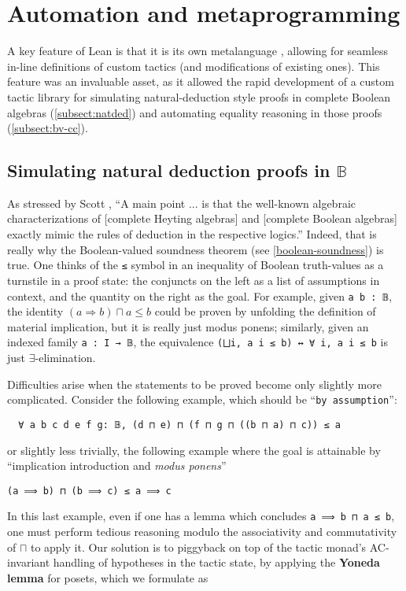 \documentclass[sigplan,10pt,review, autoref,anonymous]{acmart}
\newcommand{\lil}{\lstinline}
\theoremstyle{definition}
\begin{document}
\section{Automation and metaprogramming}
\label{section:metaprogramming}

A key feature of Lean is that it is its own metalanguage \cite{Ebner:2017:MFF:3136534.3110278}, allowing for seamless in-line definitions of custom tactics (and modifications of existing ones). This feature was an invaluable asset, as it allowed the rapid development of a custom tactic library for simulating natural-deduction style proofs in complete Boolean algebras (\autoref{subsect:natded}) and automating equality reasoning in those proofs (\autoref{subsect:bv-cc}).

\subsection{Simulating natural deduction proofs in \(\mathbb{B}\)} \label{subsect:natded}
As stressed by Scott \cite{scott2008algebraic}, ``A main point ... is that the well-known algebraic characterizations of [complete Heyting algebras] and [complete Boolean algebras] exactly mimic the rules of deduction in the respective logics.'' Indeed, that is really why the Boolean-valued soundness theorem (see \autoref{boolean-soundness}) is true. One thinks of the \lil{≤} symbol in an inequality of Boolean truth-values as a turnstile in a proof state: the conjuncts on the left as a list of assumptions in context, and the quantity on the right as the goal. For example, given \lil{a b : 𝔹}, the identity $(a \Rightarrow b) \sqcap a \leq b$ could be proven by unfolding the definition of material implication, but it is really just modus ponens; similarly, given an indexed family \lil{a : I → 𝔹}, the equivalence \lstinline{(⨆i, a i ≤ b) ↔ ∀ i, a i ≤ b} is just $\exists$-elimination.

Difficulties arise when the statements to be proved become only slightly more complicated. Consider the following example, which should be  ``\lil{by assumption}'':
\begin{lstlisting}
  ∀ a b c d e f g: 𝔹, (d ⊓ e) ⊓ (f ⊓ g ⊓ ((b ⊓ a) ⊓ c)) ≤ a
\end{lstlisting}
or slightly less trivially, the following example where the goal is attainable by ``implication introduction and \emph{modus ponens}''
\begin{lstlisting}
(a ⟹ b) ⊓ (b ⟹ c) ≤ a ⟹ c
\end{lstlisting}
In this last example, even if one has a lemma which concludes \lil{a ⟹ b ⊓ a ≤ b}, one must perform tedious reasoning modulo the associativity and commutativity of \(\sqcap\) to apply it. Our solution is to piggyback on top of the tactic monad's AC-invariant handling of hypotheses in the tactic state, by applying the \textbf{Yoneda lemma} for posets, which we formulate as
\end{document}
